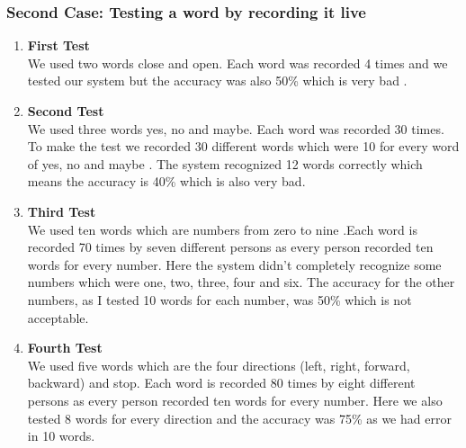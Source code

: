 \documentclass[12pt, a4paper, twoside]{report}
\begin{document}
\subsubsection{Second Case: Testing a word by recording it live}
\begin{enumerate}
\item \textbf{First Test} \\
We used two words close and open. Each word was recorded 4 times and we tested our system but the accuracy was also 50\% which is very bad .
\item \textbf{Second Test} \\
We used three words yes, no and maybe. Each word was recorded 30 times. To make the test we recorded 30 different words which were 10 for every word of yes, no and maybe . The system recognized 12 words correctly which means the accuracy is 40\% which is also very bad.
\item \textbf{Third Test} \\
We used ten words which are numbers from zero to nine .Each word is recorded 70 times by seven different persons as every person recorded ten words for every number. Here the system didn't completely recognize some numbers which were one, two, three, four and six. The accuracy for the other numbers, as I tested 10 words for each number, was 50\% which is not acceptable.
\item \textbf{Fourth Test} \\
We used five words which are the four directions (left, right, forward, backward) and stop. Each word is recorded 80 times by eight different persons as every person recorded ten words for every number. Here we also tested 8 words for every direction and the accuracy was 75\% as we had error in 10 words.
\end{enumerate}
\end{document}
